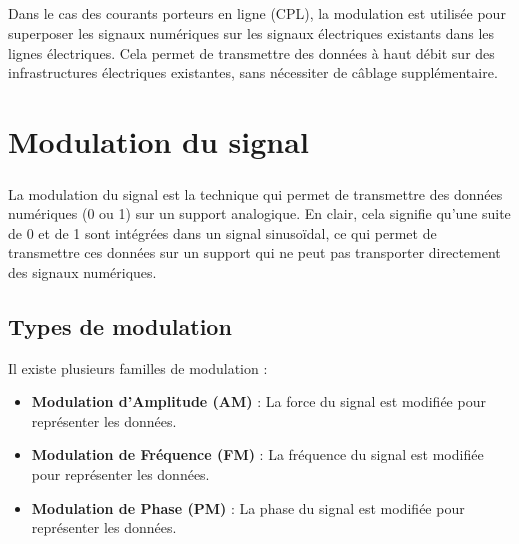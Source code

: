 \documentclass[a4paper,twocolumn]{report}
\begin{document}
\paragraph{}Dans le cas des courants porteurs en ligne (CPL), la modulation est utilisée pour superposer les signaux numériques sur les signaux électriques existants dans les lignes électriques. Cela permet de transmettre des données à haut débit sur des infrastructures électriques existantes, sans nécessiter de câblage supplémentaire.
\chapter{Modulation du signal}

\paragraph{}La modulation du signal est la technique qui permet de transmettre des données numériques (0 ou 1) sur un support analogique. En clair, cela signifie qu'une suite de 0 et de 1 sont intégrées dans un signal sinusoïdal, ce qui permet de transmettre ces données sur un support qui ne peut pas transporter directement des signaux numériques. 

\section{Types de modulation}
Il existe plusieurs familles de modulation :
\begin{itemize}
    \item \textbf{Modulation d'Amplitude (AM)} : La force du signal est modifiée pour représenter les données.
    \item \textbf{Modulation de Fréquence (FM)} : La fréquence du signal est modifiée pour représenter les données.
    \item \textbf{Modulation de Phase (PM)} : La phase du signal est modifiée pour représenter les données.
\end{itemize}
\end{document}
